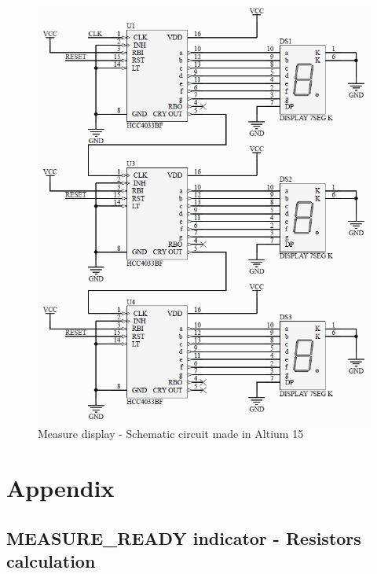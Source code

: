 \begin{figure}[H]
    \begin{centering}
    \includegraphics[width=1\textwidth]{data/Display}
    \par\end{centering}
    \caption{Measure display - Schematic circuit made in Altium 15}
\end{figure}

\newpage 
\section*{Appendix}
\subsection*{MEASURE\_READY indicator - Resistors calculation}

